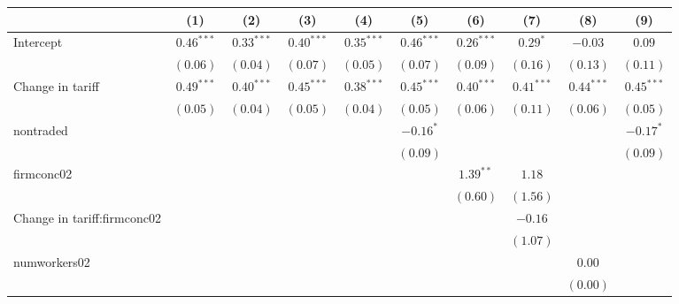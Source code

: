 
\begin{tabular}{l c c c c c c c c c }
\hline
 & (1) & (2) & (3) & (4) & (5) & (6) & (7) & (8) & (9) \\
\hline
Intercept          & $0.46^{***}$ & $0.33^{***}$ & $0.40^{***}$ & $0.35^{***}$ & $0.46^{***}$ & $0.26^{***}$ & $0.29^{*}$   & $-0.03$      & $0.09$        \\
                     & $(0.06)$     & $(0.04)$     & $(0.07)$     & $(0.05)$     & $(0.07)$     & $(0.09)$     & $(0.16)$     & $(0.13)$     & $(0.11)$      \\
Change in tariff              & $0.49^{***}$ & $0.40^{***}$ & $0.45^{***}$ & $0.38^{***}$ & $0.45^{***}$ & $0.40^{***}$ & $0.41^{***}$ & $0.44^{***}$ & $0.45^{***}$  \\
                     & $(0.05)$     & $(0.04)$     & $(0.05)$     & $(0.04)$     & $(0.05)$     & $(0.06)$     & $(0.11)$     & $(0.06)$     & $(0.05)$      \\
nontraded            &              &              &              &              & $-0.16^{*}$  &              &              &              & $-0.17^{*}$   \\
                     &              &              &              &              & $(0.09)$     &              &              &              & $(0.09)$      \\
firmconc02           &              &              &              &              &              & $1.39^{**}$  & $1.18$       &              &               \\
                     &              &              &              &              &              & $(0.60)$     & $(1.56)$     &              &               \\
Change in tariff:firmconc02   &              &              &              &              &              &              & $-0.16$      &              &               \\
                     &              &              &              &              &              &              & $(1.07)$     &              &               \\
numworkers02         &              &              &              &              &              &              &              & $0.00$       &               \\
                     &              &              &              &              &              &              &              & $(0.00)$     &               \\

\end{tabular}
